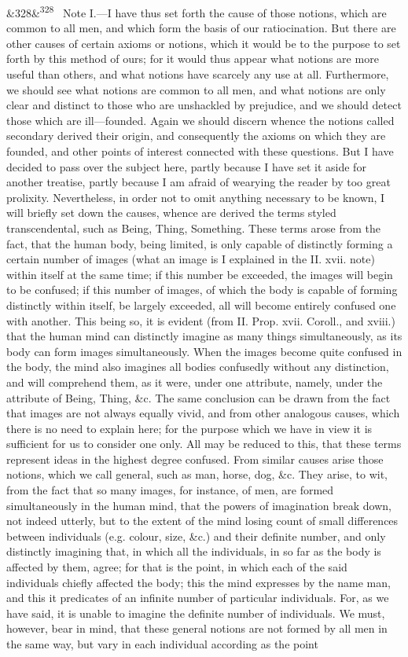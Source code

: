 \documentclass[12pt]{article}
\newcommand{\para}[1][]{\par\noindent\ifx&#1&\else\textsuperscript{\footnotesize #1}~\fi}
\begin{document}
\para[328] Note I.---I have thus set forth the cause of those notions, which are common to all men, and which form the basis of our ratiocination. But there are other causes of certain axioms or notions, which it would be to the purpose to set forth by this method of ours; for it would thus appear what notions are more useful than others, and what notions have scarcely any use at all. Furthermore, we should see what notions are common to all men, and what notions are only clear and distinct to those who are unshackled by prejudice, and we should detect those which are ill---founded. Again we should discern whence the notions called secondary derived their origin, and consequently the axioms on which they are founded, and other points of interest connected with these questions. But I have decided to pass over the subject here, partly because I have set it aside for another treatise, partly because I am afraid of wearying the reader by too great prolixity. Nevertheless, in order not to omit anything necessary to be known, I will briefly set down the causes, whence are derived the terms styled transcendental, such as Being, Thing, Something. These terms arose from the fact, that the human body, being limited, is only capable of distinctly forming a certain number of images (what an image is I explained in the II. xvii. note) within itself at the same time; if this number be exceeded, the images will begin to be confused; if this number of images, of which the body is capable of forming distinctly within itself, be largely exceeded, all will become entirely confused one with another. This being so, it is evident (from II. Prop. xvii. Coroll., and xviii.) that the human mind can distinctly imagine as many things simultaneously, as its body can form images simultaneously. When the images become quite confused in the body, the mind also imagines all bodies confusedly without any distinction, and will comprehend them, as it were, under one attribute, namely, under the attribute of Being, Thing, \&c. The same conclusion can be drawn from the fact that images are not always equally vivid, and from other analogous causes, which there is no need to explain here; for the purpose which we have in view it is sufficient for us to consider one only. All may be reduced to this, that these terms represent ideas in the highest degree confused. From similar causes arise those notions, which we call general, such as man, horse, dog, \&c. They arise, to wit, from the fact that so many images, for instance, of men, are formed simultaneously in the human mind, that the powers of imagination break down, not indeed utterly, but to the extent of the mind losing count of small differences between individuals (e.g. colour, size, \&c.) and their definite number, and only distinctly imagining that, in which all the individuals, in so far as the body is affected by them, agree; for that is the point, in which each of the said individuals chiefly affected the body; this the mind expresses by the name man, and this it predicates of an infinite number of particular individuals. For, as we have said, it is unable to imagine the definite number of individuals. We must, however, bear in mind, that these general notions are not formed by all men in the same way, but vary in each individual according as the point 
\end{document}
